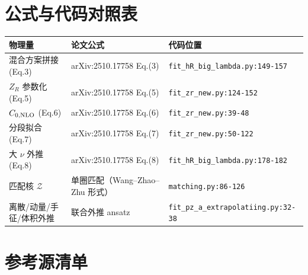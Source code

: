 \documentclass[UTF8]{ctexart}
\begin{document}


\section{公式与代码对照表}

\begin{longtable}{@{}l l l@{}}
\toprule
\textbf{物理量} & \textbf{论文公式} & \textbf{代码位置} \\
\midrule
\endhead
混合方案拼接 (Eq.3) & arXiv:2510.17758 Eq.(3) & \texttt{fit\_hR\_big\_lambda.py:149-157} \\
$Z_R$ 参数化 (Eq.5) & arXiv:2510.17758 Eq.(5) & \texttt{fit\_zr\_new.py:124-152} \\
$C_{0,\rm NLO}$ (Eq.6) & arXiv:2510.17758 Eq.(6) & \texttt{fit\_zr\_new.py:39-48} \\
分段拟合 (Eq.7) & arXiv:2510.17758 Eq.(7) & \texttt{fit\_zr\_new.py:50-122} \\
大 $\nu$ 外推 (Eq.8) & arXiv:2510.17758 Eq.(8) & \texttt{fit\_hR\_big\_lambda.py:178-182} \\
匹配核 $\mathcal Z$ & 单圈匹配（Wang--Zhao--Zhu 形式） & \texttt{matching.py:86-126} \\
离散/动量/手征/体积外推 & 联合外推 ansatz & \texttt{fit\_pz\_a\_extrapolatiing.py:32-38} \\
\bottomrule
\end{longtable}

\section{参考源清单}
\end{document}
